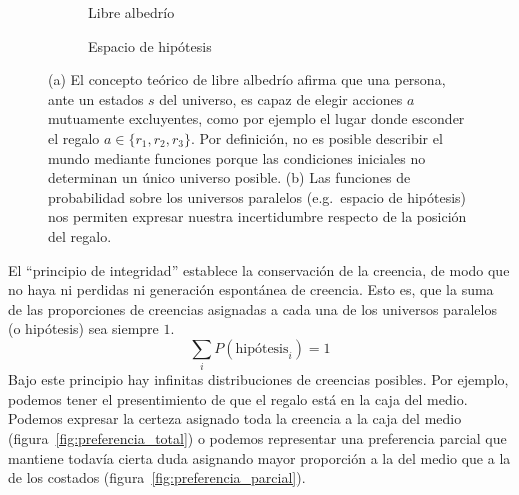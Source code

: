 \documentclass[a4paper,11pt]{book}
\theoremstyle{definition}
\begin{document}
\begin{figure}[ht!]
\centering
\begin{subfigure}[b]{0.48\textwidth}
\centering
    \caption{Libre albedrío}
    \label{fig:libre_albedrio}
\end{subfigure}
\begin{subfigure}[b]{0.48\textwidth}
 \centering
   \caption{Espacio de hipótesis}
   \label{fig:espacio_de_hipotesis}
\end{subfigure}
    \caption{(a) El concepto teórico de libre albedrío afirma que una persona, ante un estados $s$ del universo, es capaz de elegir acciones $a$ mutuamente excluyentes, como por ejemplo el lugar donde esconder el regalo $a \in \{r_1, r_2, r_3\}$. Por definición, no es posible describir el mundo mediante funciones porque las condiciones iniciales no determinan un único universo posible.
    (b) Las funciones de probabilidad sobre los universos paralelos (e.g.~espacio de hipótesis) nos permiten expresar nuestra incertidumbre respecto de la posición del regalo.}
\end{figure}


El ``principio de integridad'' establece la conservación de la creencia, de modo que no haya ni perdidas ni generación espontánea de creencia.
%
Esto es, que la suma de las proporciones de creencias asignadas a cada una de los universos paralelos (o hipótesis) sea siempre $1$.
%
\begin{equation}
\sum_{i} P(\text{hipótesis}_i) = 1
\end{equation}
%
Bajo este principio hay infinitas distribuciones de creencias posibles.
%
Por ejemplo, podemos tener el presentimiento de que el regalo está en la caja del medio.
%
Podemos expresar la certeza asignado toda la creencia a la caja del medio (figura~\ref{fig:preferencia_total}) o podemos representar una preferencia parcial que mantiene todavía cierta duda asignando mayor proporción a la del medio que a la de los costados (figura~\ref{fig:preferencia_parcial}).
\end{document}
